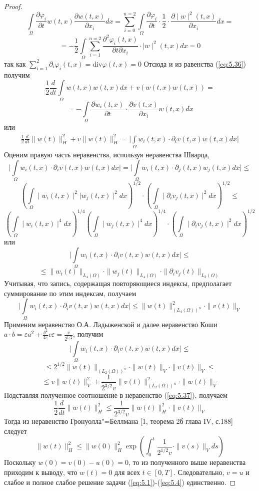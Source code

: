 \begin{proof}
    $$\int\limits_\Omega\frac{\partial \varphi_i}{\partial t}w(t, x)\frac{\partial w(t, x)}{\partial x_i}dx=
    \sum_{i=0}^{n=2}\int\limits_\Omega\frac{\partial \varphi _i}{\partial t}\cdot\frac{1}{2}\cdot\frac{\partial \mid w\mid^2(t, x)}{\partial x_i}dx=$$
    $$=-\frac{1}{2}\int\limits_\Omega\sum_{i=1}^{n=2}\frac{\partial^2 \varphi_i(t, x)}{\partial t\partial x_i}\cdot\mid w\mid^2(t, x)dx=0$$
    так как $\sum\limits_{i=1}^{2}\partial_i\varphi_i(t, x)= \textrm{div} \varphi(t, x)=0$
    Отсюда и из равенства (\ref{eq:5.36}) получим
    $$\frac{1}{2}\frac{d}{dt}\int\limits_\Omega w(t, x)w(t, x)dx+v(w(t, x)w(t, x))=$$
    $$=-\int\limits_\Omega\frac{\partial w_i(t, x)}{\partial t}\cdot\frac{\partial v(t, x)}{\partial x_i}w(t, x)dx$$
    или
    \begin{equation}\label{eq:5.37}
        \begin{gathered}
            \frac{1}{2}\frac{d}{dt}\| w(t)\|_H^2+v\| w(t)\|_H^2=
            \bigg|\int\limits_\Omega w_i(t, x)\cdot\partial_iv(t, x)w(t, x)dx\bigg|
        \end{gathered}
    \end{equation}
    Оценим правую часть неравенства, используя неравенства Шварца,
    $$\bigg|\int\limits_\Omega w_i(t, x)\cdot\partial_iv(t, x)w(t, x)dx\bigg|=
    \bigg|\int\limits_\Omega w_i(t, x)\cdot\partial_j(t, x)w_j(t, x)dx\bigg|\le$$
    $$\left(\int\limits_\Omega \mid w_i(t, x)\mid^2|w_j(t, x)\mid^2dx \right)^{1/2}
    \cdot\left(\int\limits_\Omega\mid\partial_iv_j(t, x) \mid^2dx \right)^{1/2}\le$$
    $$\left(\int\limits_\Omega \mid w_i(t, x)\mid^4dx\right)^{1/4}\left(\int\limits_\Omega \mid w_j(t, x)\mid^4dx\right)^{1/4}
    \cdot\left(\int\limits_\Omega\mid\partial_iv_j(t, x) \mid^2dx \right)^{1/2}$$
    или
    $$\bigg|\int\limits_\Omega w_i(t, x)\cdot\partial_iv(t, x)w(t, x)dx\bigg|\le$$
    $$\le\| w_i(t)\|_{L_4(\Omega)}\cdot\| w_j(t)\|_{L_4(\Omega)}\cdot\|\partial_iv_j(t)\|_{L_2(\Omega)}$$
    Учитывая, что запись, содержащая повторяющиеся индексы, предполагает суммирование по этим индексам, получаем
    $$\bigg|\int\limits_\Omega w_i(t, x)\cdot\partial_iv(t, x)w(t, x)dx\bigg|\le\| w(t)\|_{(L_4(\Omega))^n}^2\cdot\| v(t)\|_V$$
    Применим неравенство О.А. Ладыженской и далее неравенство Коши \linebreak
    $a\cdot b=\varepsilon a^2+\frac{b^2}{4\varepsilon}c\varepsilon=\frac{v}{2^{1/2}}$, получим
    $$\bigg|\int\limits_\Omega w_i(t, x)\cdot\partial_iv(t, x)w(t, x)dx\bigg|\le$$
    $$\le 2^{1/2}\| w(t)\|_{(L_2(\Omega))^n}\cdot\| w(t)\|_V\cdot\| v(t)\|_V\le$$
    $$\le v\| w(t)\|_V^2+\frac{1}{2^{3/2}v}\| v(t)\|_{(L_2(\Omega))^n}^2\cdot\| w(t)\|_V$$
    Подставляя полученное соотношение в неравенство (\ref{eq:5.37}), получаем
    $$\frac{1}{2}\frac{d}{dt}\| w(t)\|_H^2\le\frac{1}{2^{3/2}v}\| w(t)\|_H^2\cdot\| v(t)\|_V$$
    Тогда из неравенство Гронуолла"=Беллмана [1, теорема 2б глава IV, с.188] следует
    $$\| w(t)\|_H^2\le\| w(0)\|_H^2\exp\left(\int_0^t\frac{1}{2^{1/2}v}\cdot\| v(s)\|_Vds\right)$$
    Поскольку $w(0) = v(0)- u(0) = 0$, то из полученного выше неравенства приходим к выводу,
    что $w(t)=0$ для всех $t\in[0, T]$. Следовательно, $v=u$ и слабое и полное слабое решение задачи (\ref{eq:5.1})-(\ref{eq:5.4}) единственно.
\end{proof}


\clearpage
{}
\nocite{*}
\printbibliography{}
